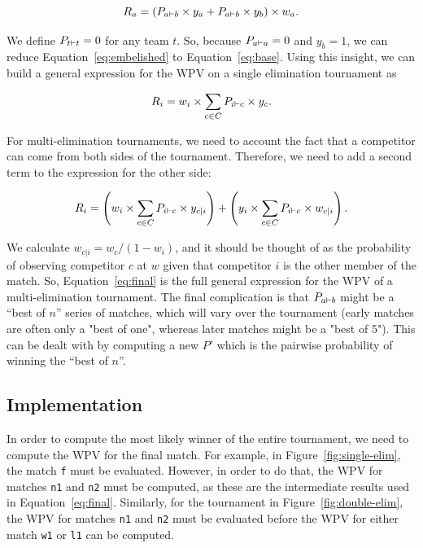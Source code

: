 \documentclass{article}
\begin{document}
\begin{equation}
R_a = (P_{a \vdash b} \times y_a + P_{a \vdash b} \times y_b) \times w_a.
\label{eq:embelished}
\end{equation}

We define $P_{t \vdash t} = 0$ for any team $t$. So, because $P_{a \vdash a} = 0$ and $y_b = 1$, we can reduce
Equation~\ref{eq:embelished} to Equation~\ref{eq:base}. Using this insight, we can build a general expression for the
WPV on a single elimination tournament as

\begin{equation}
  R_i = w_i \times \sum_{c\in C} P_{i \vdash c} \times y_c.
\end{equation}

For multi-elimination tournaments, we need to account the fact that a competitor can come from both sides of the
tournament. Therefore, we need to add a second term to the expression for the other side:

\begin{equation}
  R_i = \left(w_i \times \sum_{c\in C} P_{i \vdash c} \times y_{c|i} \right) +
        \left(y_i \times \sum_{c\in C} P_{i \vdash c} \times w_{c|i} \right).
        \label{eq:final}
\end{equation}

We calculate $w_{c|i} = w_{c}/(1 - w_i)$, and it should be thought of as the probability of observing competitor $c$ at
$w$ given that competitor $i$ is the other member of the match. So, Equation~\ref{eq:final} is the full general
expression for the WPV of a multi-elimination tournament. The final complication is that $P_{a \vdash b}$ might be a
``best of $n$'' series of matches, which will vary over the tournament (early matches are often only a "best of one",
whereas later matches might be a "best of 5"). This can be dealt with by computing a new $P'$ which is the pairwise
probability of winning the ``best of $n$''.

\subsection{Implementation}

In order to compute the most likely winner of the entire tournament, we need to compute the WPV for the final match. For
example, in Figure~\ref{fig:single-elim}, the match \texttt{f} must be evaluated. However, in order to do that, the WPV
for matches \texttt{n1} and \texttt{n2} must be computed, as these are the intermediate results used in
Equation~\ref{eq:final}. Similarly, for the tournament in Figure~\ref{fig:double-elim}, the WPV for matches \texttt{n1}
and \texttt{n2} must be evaluated before the WPV for either match \texttt{w1} or \texttt{l1} can be computed.
\end{document}
